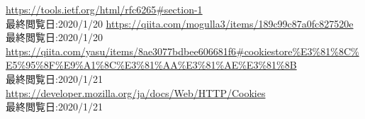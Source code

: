 \def\line{−\hspace*{-.7zw}−}

\begin{thebibliography}{99}


 \url{https://tools.ietf.org/html/rfc6265#section-1} \\ 最終閲覧日:2020/1/20
 \url{https://qiita.com/mogulla3/items/189c99c87a0fc827520e} \\ 最終閲覧日:2020/1/20
 \url{https://qiita.com/yasu/items/8ae3077bdbee606681f6#cookiestore%E3%81%8C%E5%95%8F%E9%A1%8C%E3%81%AA%E3%81%AE%E3%81%8B} \\ 最終閲覧日:2020/1/21
 \url{https://developer.mozilla.org/ja/docs/Web/HTTP/Cookies} \\最終閲覧日:2020/1/21
\end{thebibliography}

